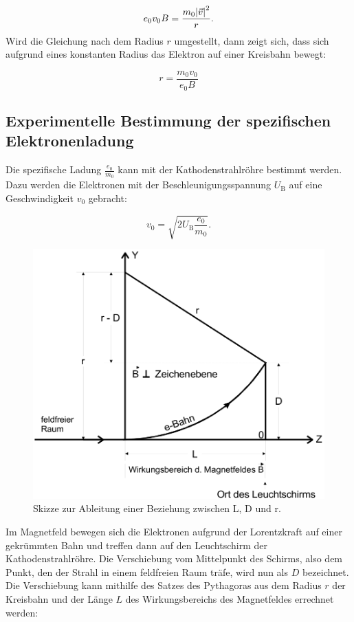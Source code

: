 \begin{equation}
e_0 v_0 B = \frac{m_0 \abs{\vec{v}}^2}{r}.
\end{equation}
Wird die Gleichung nach dem Radius $r$ umgestellt, dann zeigt sich, dass sich aufgrund eines konstanten Radius das Elektron auf einer Kreisbahn bewegt:

\begin{equation}
r = \frac{m_0 v_0}{e_0 B}
\label{eqn:radius}
\end{equation}




\subsection{Experimentelle Bestimmung der spezifischen Elektronenladung}

Die spezifische Ladung $\frac{e_0}{m_0}$ kann mit der Kathodenstrahlröhre bestimmt werden. Dazu werden die Elektronen mit der Beschleunigungsspannung $U_{\text{B}}$ auf eine Geschwindigkeit $v_0$ gebracht:

\begin{equation}
v_0 = \sqrt{2U_{\text{B}} \frac{e_0}{m_0}}.
\label{eqn:geschwindigkeitspannung}
\end{equation}

\begin{figure}[h!]
	\centering
	\includegraphics[width=0.8\linewidth]{bahnkurve.png}
	\caption{Skizze zur Ableitung einer Beziehung zwischen L, D und r.}
	\label{fig:bahnkurve}
\end{figure}

Im Magnetfeld bewegen sich die Elektronen aufgrund der Lorentzkraft auf einer gekrümmten Bahn und treffen dann auf den Leuchtschirm der Kathodenstrahlröhre. Die Verschiebung vom Mittelpunkt des Schirms, also dem Punkt, den der Strahl
in einem feldfreien Raum träfe, wird nun als $D$ bezeichnet. Die Verschiebung kann mithilfe des Satzes des Pythagoras aus dem Radius $r$ der Kreisbahn und der Länge $L$ des Wirkungsbereichs des Magnetfeldes errechnet werden:

